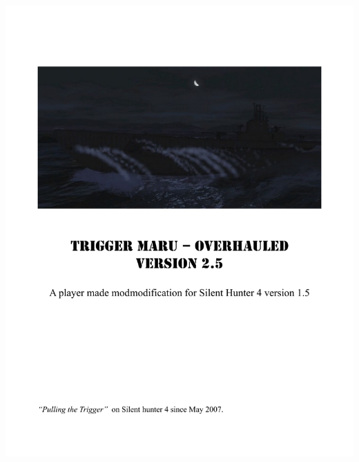 \documentclass{article}
\begin{document}
\includegraphics[page={28}, width=\textwidth, height=\textheight]{TMO_Manual}



\end{document}
